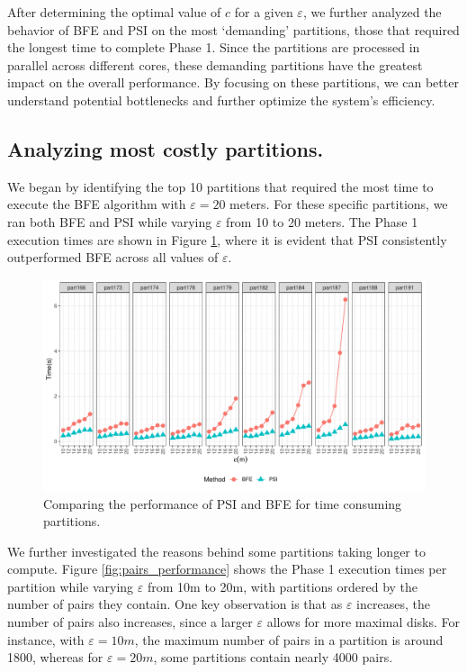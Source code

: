 After determining the optimal value of $c$ for a given $\varepsilon$, we further analyzed the behavior of BFE and PSI on the most `demanding' partitions, those that required the longest time to complete Phase 1. Since the partitions are processed in parallel across different cores, these demanding partitions have the greatest impact on the overall performance. By focusing on these partitions, we can better understand potential bottlenecks and further optimize the system's efficiency.

\subsection{Analyzing most costly partitions.}
We began by identifying the top 10 partitions that required the most time to execute the BFE algorithm with $\varepsilon = 20$ meters. For these specific partitions, we ran both BFE and PSI while varying $\varepsilon$ from 10 to 20 meters. The Phase 1 execution times are shown in Figure \ref{fig:top_time_partitions}, where it is evident that PSI consistently outperformed BFE across all values of $\varepsilon$.

\begin{figure}
    \centering
    \includegraphics[width=\linewidth]{chapter4/figures/plots/03_top_time_partitions/top_time_partitions.pdf}
    \caption{Comparing the performance of PSI and BFE for time consuming  partitions.} \label{fig:top_time_partitions}
\end{figure}

We further investigated the reasons behind some partitions taking longer to compute. Figure \ref{fig:pairs_performance} shows the Phase 1 execution times per partition while varying $\varepsilon$ from 10m to 20m, with partitions ordered by the number of pairs they contain. One key observation is that as $\varepsilon$ increases, the number of pairs also increases, since a larger $\varepsilon$ allows for more maximal disks. For instance, with $\varepsilon = 10m$, the maximum number of pairs in a partition is around 1800, whereas for $\varepsilon = 20m$, some partitions contain nearly 4000 pairs.

